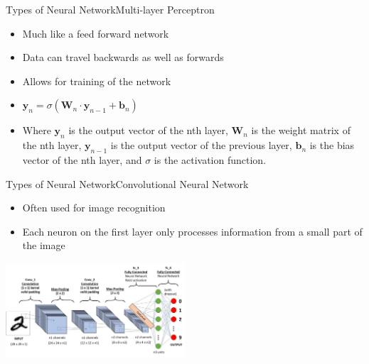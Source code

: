 \documentclass{beamer}
\begin{document}
\begin{frame}{Types of Neural Network}{Multi-layer Perceptron}
    \begin{itemize}
        \item Much like a feed forward network
        \item Data can travel backwards as well as forwards
        \item Allows for training of the network
        \item $\textbf{y}_n=\sigma{(\textbf{W}_n\cdot\textbf{y}_{n-1} + \textbf{b}_n)}$
        \item Where $\textbf{y}_n$ is the output vector of the nth layer, $\textbf{W}_n$ is the weight matrix of the nth layer, $\textbf{y}_{n-1}$ is the output vector of the previous layer, $\textbf{b}_n$ is the bias vector of the nth layer, and $\sigma$ is the activation function.
    \end{itemize}
\end{frame}


\begin{frame}{Types of Neural Network}{Convolutional Neural Network}
    \begin{multicols}{2}
        \begin{itemize}
            \item Often used for image recognition
            \item Each neuron on the first layer only processes information from a small part of the image
        \end{itemize}
        \begin{center}
            \includegraphics[width=0.5\textwidth]{images/convolutional2}
        \end{center}
    \end{multicols}
\end{frame}
\end{document}
